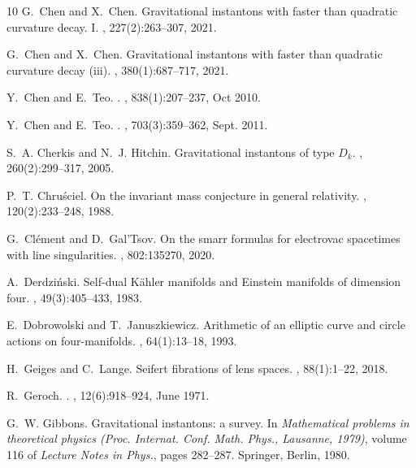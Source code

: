 \documentclass[a4paper,10pt,reqno]{amsart}
\theoremstyle{plain}
\numberwithin{equation}{section}
\begin{document}
\begin{thebibliography}{10}
G.~Chen and X.~Chen.
\newblock Gravitational instantons with faster than quadratic curvature decay.
  {I}.
, 227(2):263--307, 2021.

G.~Chen and X.~Chen.
\newblock Gravitational instantons with faster than quadratic curvature decay
  (iii).
, 380(1):687--717, 2021.

Y.~{Chen} and E.~{Teo}.
.
, 838(1):207--237, Oct 2010.

Y.~{Chen} and E.~{Teo}.
.
, 703(3):359--362, Sept. 2011.

S.~A. Cherkis and N.~J. Hitchin.
\newblock Gravitational instantons of type {$D_k$}.
, 260(2):299--317, 2005.

P.~T. Chru\'{s}ciel.
\newblock On the invariant mass conjecture in general relativity.
, 120(2):233--248, 1988.

G.~Cl{\'e}ment and D.~Gal'Tsov.
\newblock On the smarr formulas for electrovac spacetimes with line
  singularities.
, 802:135270, 2020.

A.~Derdzi\'{n}ski.
\newblock Self-dual {K}\"{a}hler manifolds and {E}instein manifolds of
  dimension four.
, 49(3):405--433, 1983.

E.~Dobrowolski and T.~Januszkiewicz.
\newblock Arithmetic of an elliptic curve and circle actions on four-manifolds.
, 64(1):13--18, 1993.

H.~Geiges and C.~Lange.
\newblock Seifert fibrations of lens spaces.
, 88(1):1--22, 2018.

R.~{Geroch}.
.
, 12(6):918--924, June 1971.

G.~W. Gibbons.
\newblock Gravitational instantons: a survey.
\newblock In {\em Mathematical problems in theoretical physics ({P}roc.
  {I}nternat. {C}onf. {M}ath. {P}hys., {L}ausanne, 1979)}, volume 116 of {\em
  Lecture Notes in Phys.}, pages 282--287. Springer, Berlin, 1980.


\end{thebibliography}
\end{document}
